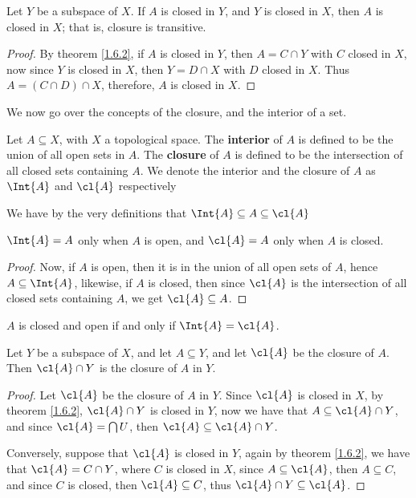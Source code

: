 \begin{theorem}\label{1.6.3}
    Let $Y$ be a subspace of  $X$. If  $A$ is closed in  $Y$, and  $Y$ is closed
    in  $X$, then  $A$ is closed in  $X$; that is, closure is transitive.
\end{theorem}
\begin{proof}
    By theorem \ref{1.6.2}, if $A$ is closed in  $Y$, then  $A=C \cap Y$ with
    $C$ closed in  $X$, now since  $Y$ is closed in  $X$, then  $Y=D \cap X$
    with  $D$ closed in  $X$. Thus  $A=(C \cap D) \cap X$, therefore,  $A$ is
    closed in  $X$.		
\end{proof}

We now go over the concepts of the closure, and the interior of a set.

\begin{definition}
    Let $A \subseteq X$, with  $X$ a topological space. The  \textbf{interior}
    of $A$ is defined to be the union of all open sets in  $A$. The
    \textbf{closure} of $A$ is defined to be the intersection of all closed sets
    containing $A$. We denote the interior and the closure of  $A$ as  $\Int{A}$
    and  $\cl{A}$ respectively
\end{definition}

We have by the very definitions that $\Int{A} \subseteq A \subseteq \cl{A}$

\begin{lemma}\label{1.6.4}
    $\Int{A}=A$ only when  $A$ is open, and  $\cl{A}=A$ only when  $A$ is
    closed.
\end{lemma}
\begin{proof}
    Now, if $A$ is open, then it is in the union of all open sets of  $A$, hence
    $A \subseteq \Int{A}$, likewise, if  $A$ is closed, then since $\cl{A}$ is
    the intersection of all closed sets containing  $A$, we get $\cl{A}
    \subseteq A$.
\end{proof}
\begin{corollary}
    $A$ is closed and open if and only if  $\Int{A}=\cl{A}$.
\end{corollary}

\begin{theorem}\label{1.6.5}
    Let $Y$ be a subspace of  $X$, and let  $A \subseteq Y$, and let $\cl{A}$
    be the closure of $A$. Then  $\cl{A} \cap Y$ is the closure of  $A$ in
    $Y$.
\end{theorem}
\begin{proof}
    Let $\cl{A}$ be the closure of  $A$ in  $Y$. Since  $\cl{A}$ is closed in
    $X$, by theorem \ref{1.6.2},  $\cl{A} \cap Y$ is closed in  $Y$, now we
    have that $A \subseteq \cl{A} \cap Y$, and since $\cl{A}=\bigcap{U}$, then
    $\cl{A} \subseteq \cl{A} \cap Y$.

    Conversely, suppose that $\cl{A}$ is closed in  $Y$, again by theorem
    \ref{1.6.2}, we have that  $\cl{A}=C \cap Y$, where  $C$ is closed in  $X$,
    since  $A \subseteq \cl{A}$, then  $A \subseteq C$, and since  $C$ is
    closed, then  $\cl{A} \subseteq C$, thus  $\cl{A} \cap Y \subseteq
    \cl{A}$.
\end{proof}

